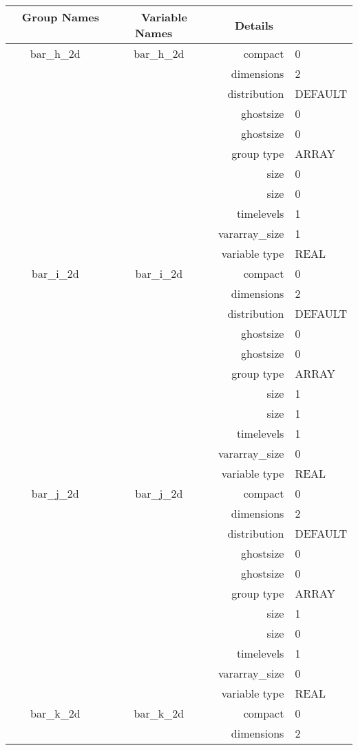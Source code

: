 \begin{tabular*}{150mm}{|c|c@{\extracolsep{\fill}}|rl|} \hline 
~ {\bf Group Names} ~ & ~ {\bf Variable Names} ~  &{\bf Details} ~ & ~ \\ 
\hline 
bar\_h\_2d & bar\_h\_2d & compact & 0 \\ 
 &  & dimensions & 2 \\ 
 &  & distribution & DEFAULT \\ 
 &  & ghostsize & 0 \\ 
& ~ & ghostsize & 0 \\ 
 &  & group type & ARRAY \\ 
 &  & size & 0 \\ 
& ~ & size & 0 \\ 
 &  & timelevels & 1 \\ 
 &  & vararray\_size & 1 \\ 
 &  & variable type & REAL \\ 
\hline 
bar\_i\_2d & bar\_i\_2d & compact & 0 \\ 
 &  & dimensions & 2 \\ 
 &  & distribution & DEFAULT \\ 
 &  & ghostsize & 0 \\ 
& ~ & ghostsize & 0 \\ 
 &  & group type & ARRAY \\ 
 &  & size & 1 \\ 
& ~ & size & 1 \\ 
 &  & timelevels & 1 \\ 
 &  & vararray\_size & 0 \\ 
 &  & variable type & REAL \\ 
\hline 
bar\_j\_2d & bar\_j\_2d & compact & 0 \\ 
 &  & dimensions & 2 \\ 
 &  & distribution & DEFAULT \\ 
 &  & ghostsize & 0 \\ 
& ~ & ghostsize & 0 \\ 
 &  & group type & ARRAY \\ 
 &  & size & 1 \\ 
& ~ & size & 0 \\ 
 &  & timelevels & 1 \\ 
 &  & vararray\_size & 0 \\ 
 &  & variable type & REAL \\ 
\hline 
bar\_k\_2d & bar\_k\_2d & compact & 0 \\ 
 &  & dimensions & 2 \\ 

\end{tabular*}
